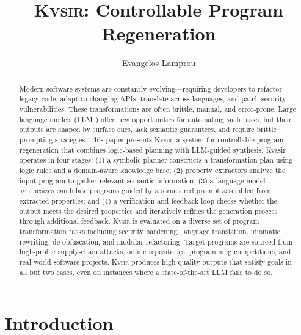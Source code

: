 \documentclass[sigplan,review,anonymous,10pt]{acmart}
\newcommand{\sys}{{\scshape Kv{\textalpha}sir}\xspace}
\begin{document}
\title{\sys: Controllable Program Regeneration}
\author{Evangelos Lamprou}



\begin{abstract}
Modern software systems are constantly evolving—requiring developers to
  refactor legacy code, adapt to changing APIs, translate across languages, and
  patch security vulnerabilities. These transformations are often brittle,
  manual, and error-prone. Large language models (LLMs) offer new opportunities
  for automating such tasks, but their outputs are shaped by surface cues, lack
  semantic guarantees, and require brittle prompting strategies. This paper
  presents \sys, a system for controllable program regeneration that combines
  logic-based planning with LLM-guided synthesis.
Kvasir operates in four stages: (1) a symbolic planner constructs a
transformation plan using logic rules and a domain-aware knowledge base; (2)
property extractors analyze the input program to gather relevant semantic
information; (3) a language model synthesizes candidate programs guided by
a structured prompt assembled from extracted properties; and (4) a verification
and feedback loop checks whether the output meets the desired properties and
iteratively refines the generation process through additional feedback.
\sys is evaluated on a diverse set of program transformation tasks
including security hardening, language translation, idiomatic rewriting, de-obfuscation,
and modular refactoring.
Target programs are sourced from high-profile supply-chain attacks, 
online repositories, programming competitions, and real-world software projects.
\sys produces high-quality outputs that satisfy goals in all but two cases,
even on instances where a state-of-the-art LLM fails to do so.
\end{abstract}
\maketitle

\section{Introduction}
\end{document}

